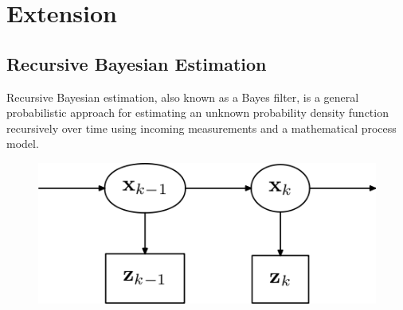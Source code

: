 \documentclass[twocolumn]{article}
\numberwithin{equation}{section}
\begin{document}
\section{Extension}
	\subsection{Recursive Bayesian Estimation}
Recursive Bayesian estimation, also known as a Bayes filter, is a general probabilistic approach for estimating an unknown probability density function recursively over time using incoming measurements and a mathematical process model.



\begin{figure}[H]
    \centering
    \includegraphics[width=.49\textwidth]{466px-HMM_Kalman_Filter_Derivation.png}
\end{figure}









	
	
\end{document}
